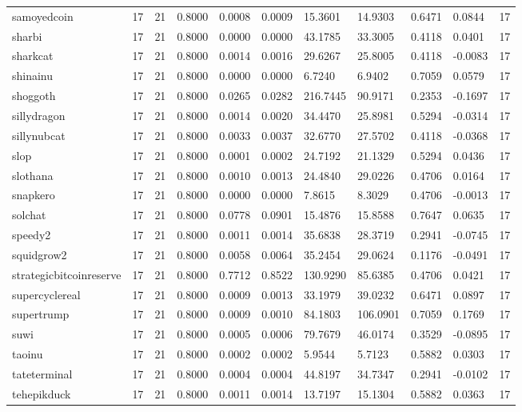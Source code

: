 \begin{table}[htbp]
\begin{tabular}{lllllllllll}
samoyedcoin & 17 & 21 & 0.8000 & 0.0008 & 0.0009 & 15.3601 & 14.9303 & 0.6471 & 0.0844 & 17 \\
sharbi & 17 & 21 & 0.8000 & 0.0000 & 0.0000 & 43.1785 & 33.3005 & 0.4118 & 0.0401 & 17 \\
sharkcat & 17 & 21 & 0.8000 & 0.0014 & 0.0016 & 29.6267 & 25.8005 & 0.4118 & -0.0083 & 17 \\
shinainu & 17 & 21 & 0.8000 & 0.0000 & 0.0000 & 6.7240 & 6.9402 & 0.7059 & 0.0579 & 17 \\
shoggoth & 17 & 21 & 0.8000 & 0.0265 & 0.0282 & 216.7445 & 90.9171 & 0.2353 & -0.1697 & 17 \\
sillydragon & 17 & 21 & 0.8000 & 0.0014 & 0.0020 & 34.4470 & 25.8981 & 0.5294 & -0.0314 & 17 \\
sillynubcat & 17 & 21 & 0.8000 & 0.0033 & 0.0037 & 32.6770 & 27.5702 & 0.4118 & -0.0368 & 17 \\
slop & 17 & 21 & 0.8000 & 0.0001 & 0.0002 & 24.7192 & 21.1329 & 0.5294 & 0.0436 & 17 \\
slothana & 17 & 21 & 0.8000 & 0.0010 & 0.0013 & 24.4840 & 29.0226 & 0.4706 & 0.0164 & 17 \\
snapkero & 17 & 21 & 0.8000 & 0.0000 & 0.0000 & 7.8615 & 8.3029 & 0.4706 & -0.0013 & 17 \\
solchat & 17 & 21 & 0.8000 & 0.0778 & 0.0901 & 15.4876 & 15.8588 & 0.7647 & 0.0635 & 17 \\
speedy2 & 17 & 21 & 0.8000 & 0.0011 & 0.0014 & 35.6838 & 28.3719 & 0.2941 & -0.0745 & 17 \\
squidgrow2 & 17 & 21 & 0.8000 & 0.0058 & 0.0064 & 35.2454 & 29.0624 & 0.1176 & -0.0491 & 17 \\
strategicbitcoinreserve & 17 & 21 & 0.8000 & 0.7712 & 0.8522 & 130.9290 & 85.6385 & 0.4706 & 0.0421 & 17 \\
supercyclereal & 17 & 21 & 0.8000 & 0.0009 & 0.0013 & 33.1979 & 39.0232 & 0.6471 & 0.0897 & 17 \\
supertrump & 17 & 21 & 0.8000 & 0.0009 & 0.0010 & 84.1803 & 106.0901 & 0.7059 & 0.1769 & 17 \\
suwi & 17 & 21 & 0.8000 & 0.0005 & 0.0006 & 79.7679 & 46.0174 & 0.3529 & -0.0895 & 17 \\
taoinu & 17 & 21 & 0.8000 & 0.0002 & 0.0002 & 5.9544 & 5.7123 & 0.5882 & 0.0303 & 17 \\
tateterminal & 17 & 21 & 0.8000 & 0.0004 & 0.0004 & 44.8197 & 34.7347 & 0.2941 & -0.0102 & 17 \\
tehepikduck & 17 & 21 & 0.8000 & 0.0011 & 0.0014 & 13.7197 & 15.1304 & 0.5882 & 0.0363 & 17 \\

\end{tabular}
\end{table}
